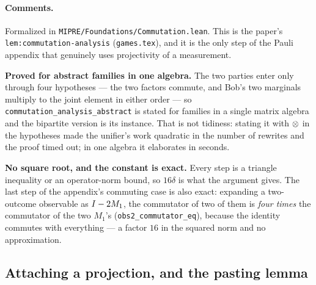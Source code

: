 \paragraph{Comments.} Formalized in \texttt{MIPRE/Foundations/Commutation.lean}. This is the
paper's \texttt{lem:commutation-analysis} (\texttt{games.tex}), and it is the only step of the
Pauli appendix that genuinely uses projectivity of a measurement.

\textbf{Proved for abstract families in one algebra.} The two parties enter only through four
hypotheses --- the two factors commute, and Bob's two marginals multiply to the joint element in
either order --- so \texttt{commutation\_analysis\_abstract} is stated for families in a single
matrix algebra and the bipartite version is its instance. That is not tidiness: stating it with
$\otimes$ in the hypotheses made the unifier's work quadratic in the number of rewrites and the proof
timed out; in one algebra it elaborates in seconds.

\textbf{No square root, and the constant is exact.} Every step is a triangle inequality or an
operator-norm bound, so $16\delta$ is what the argument gives. The last step of the appendix's
commuting case is also exact: expanding a two-outcome observable as $I - 2 M_1$, the commutator
of two of them is \emph{four times} the commutator of the two $M_1$'s
(\texttt{obs2\_commutator\_eq}), because the identity commutes with everything --- a factor $16$ in
the squared norm and no approximation.

\subsection{Attaching a projection, and the pasting lemma}

